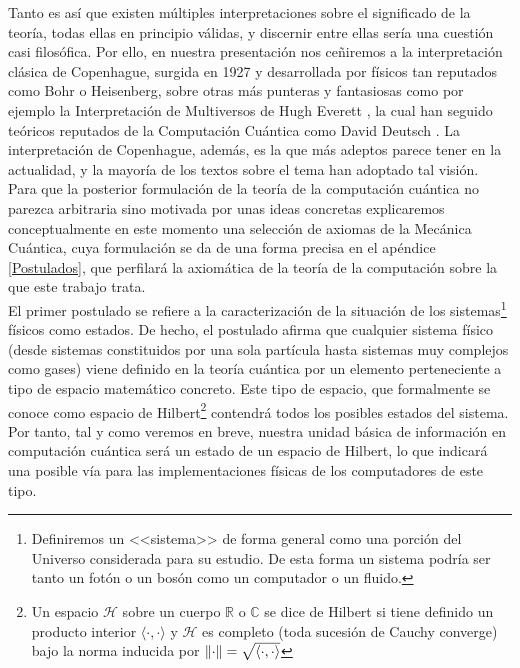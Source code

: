 \documentclass[11pt, spanish]{report}
\numberwithin{equation}{section}
\numberwithin{defin}{section}
\begin{document}
Tanto es así que existen múltiples interpretaciones sobre el significado de la teoría, todas ellas en principio válidas, y discernir entre ellas sería una cuestión casi filosófica. Por ello, en nuestra presentación nos ceñiremos a la interpretación clásica de Copenhague, surgida en 1927 y desarrollada por físicos tan reputados como Bohr o Heisenberg, sobre otras más punteras y fantasiosas como por ejemplo la Interpretación de Multiversos de Hugh Everett \cite{dewitt2015many}, la cual han seguido teóricos reputados de la Computación Cuántica como David Deutsch \cite{deutsch1998fabric}. La interpretación de Copenhague, además, es la que más adeptos parece tener en la actualidad, y la mayoría de los textos sobre el tema han adoptado tal visión.\\

Para que la posterior formulación de la teoría de la computación cuántica no parezca arbitraria sino motivada por unas ideas concretas explicaremos conceptualmente en este momento una selección de axiomas de la Mecánica Cuántica, cuya formulación se da de una forma precisa en el apéndice \ref{Postulados}, que perfilará la axiomática de la teoría de la computación sobre la que este trabajo trata.\\

El primer postulado se refiere a la caracterización de la situación de los sistemas\footnote{Definiremos un <<sistema>> de forma general como una porción del Universo considerada para su estudio. De esta forma un sistema podría ser tanto un fotón o un bosón como un computador o un fluido.} físicos como estados. De hecho, el postulado afirma que cualquier sistema físico (desde sistemas constituidos por una sola partícula hasta sistemas muy complejos como gases) viene definido en la teoría cuántica por un elemento perteneciente a tipo de espacio matemático concreto. Este tipo de espacio, que formalmente se conoce como espacio de Hilbert\footnote{Un espacio $\mathcal{H}$ sobre un cuerpo $\mathbb{R}$ o $\mathbb{C}$  se dice de Hilbert si tiene definido un producto interior $\langle \cdot, \cdot \rangle$ y $\mathcal{H}$ es completo (toda sucesión de Cauchy converge) bajo la norma inducida por $\norm{\cdot} = \sqrt{\langle \cdot, \cdot \rangle}$} contendrá todos los posibles estados del sistema. Por tanto, tal y como veremos en breve, nuestra unidad básica de información en computación cuántica será un estado de un espacio de Hilbert, lo que indicará una posible vía para las implementaciones físicas de los computadores de este tipo.\\
\end{document}

